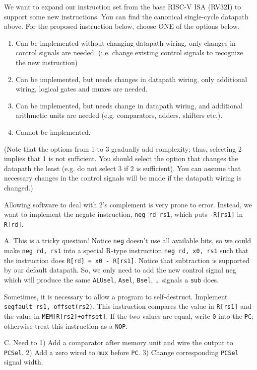\begin{blocksection}
\question
We want to expand our instruction set from the base RISC-­V ISA (RV32I) to support some new instructions. You can find the canonical single-cycle datapath above. For the proposed instruction below, choose ONE of the options below.

\begin{enumerate}
    \item Can be implemented without changing datapath wiring, only changes in control signals are needed. (i.e. change existing control signals to recognize the new instruction)
    \item Can be implemented, but needs changes in datapath wiring, only additional wiring, logical gates and muxes are needed.
    \item Can be implemented, but needs change in datapath wiring, and additional arithmetic units are needed (e.g. comparators, adders, shifters etc.).
    \item Cannot be implemented.
\end{enumerate}

(Note that the options from 1 to 3 gradually add complexity; thus, selecting 2 implies that 1 is not sufficient. You should select the option that changes the datapath the least (e.g. do not select 3 if 2 is sufficient). You can assume that necessary changes in the control signals will be made if the datapath wiring is changed.)

\begin{parts}

\item Allowing software to deal with 2’s complement is very prone to error. Instead, we want to implement the negate instruction, \texttt{neg rd rs1}, which puts \texttt{-R[rs1]} in \texttt{R[rd]}.

\begin{solution}[0.5in]
A. This is a tricky question! Notice \texttt{neg} doesn’t use all available bits, so we could make \texttt{neg rd, rs1} into a special R-type instruction \texttt{neg rd, x0, rs1} such that the instruction does \texttt{R[rd] = x0 - R[rs1]}. Notice that subtraction is supported by our default datapath. So, we only need to add the new control signal neg which will produce the same \texttt{ALUsel}, \texttt{Asel}, \texttt{Bsel}, … signals a \texttt{sub} does.
\end{solution}

\item Sometimes, it is necessary to allow a program to self­-destruct. Implement \texttt{segfault rs1, offset(rs2)}. This instruction compares the value in \texttt{R[rs1]} and the value in \texttt{MEM[R[rs2]+offset]}. If the two values are equal, write \texttt{0} into the \texttt{PC}; otherwise treat this instruction as a \texttt{NOP}.

\begin{solution}[0.5in]
 C. Need to 1) Add a comparator after memory unit and wire the output to \texttt{PCSel}. 2) Add a zero wired to \texttt{mux} before \texttt{PC}. 3) Change corresponding \texttt{PCSel} signal width.
\end{solution}
\end{parts}

\end{blocksection}